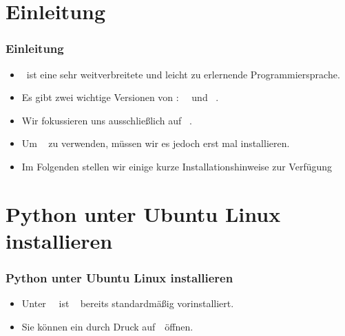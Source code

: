 \documentclass[aspectratio=169,mathserif,notheorems]{beamer}%
\subtitle{3.~Python Installieren}%
\begin{document}
%
%
\startPresentation%
%
\section{Einleitung}%
%
\begin{frame}%
\frametitle{Einleitung}%
\begin{itemize}%
\item \python\ ist eine sehr weitverbreitete und leicht zu erlernende Programmiersprache.%
\item<2-> Es gibt zwei wichtige Versionen von \python:~\python~ und \python~.%
\item<3-> Wir fokussieren uns ausschließlich auf \python~.%
\item<4-> Um \python~ zu verwenden, müssen wir es jedoch erst mal installieren.%
\item<5-> Im Folgenden stellen wir einige kurze Installationshinweise zur Verfügung
\end{itemize}%
\end{frame}%
%
\section{Python unter Ubuntu Linux installieren}%
%
\begin{frame}[t]%
\frametitle{Python unter Ubuntu Linux installieren}%
\begin{itemize}%
\item Unter \ubuntu\ \linux\ ist \python~ bereits standardmäßig vorinstalliert.%
\item<2-> Sie können ein  durch Druck auf~\ubuntuTerminal\ öffnen.%
\end{itemize}%
%
%
\end{frame}%
%
\end{document}

